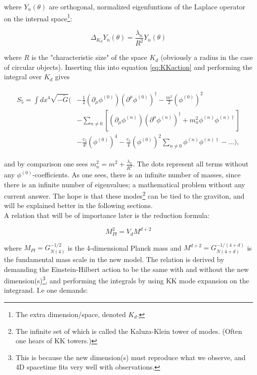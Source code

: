 \documentclass[11pt,a4paper]{article}
\begin{document}
where $Y_n(\theta)$ are orthogonal, normalized eigenfuntions of the Laplace operator on the internal space\footnote{The extra dimension/space, denoted $K_d$.}:

\begin{equation}
	\Delta_{K_d}Y_n(\theta) = \frac{\lambda_n}{R^2}Y_n(\theta)
\end{equation}

where $R$ is the "characteristic size" of the space $K_d$ (obviously a radius in the case of circular objects). Inserting this into equation \ref{eq:KKaction} and performing the integral over $K_d$ gives

\begin{align}
	\begin{split}
	S_5 = \int dx^4 \sqrt{-\tilde{G}}\bigg(&-\frac{1}{2}(\partial_ \mu\phi^{(0)})(\partial^\mu\phi^{(0)})^\dagger - \frac{m^2}{2}\left(\phi^{(0)}\right)^2\\
	& - \sum_{n\neq0} \left[(\partial_ \mu\phi^{(n)})(\partial^\mu\phi^{(n)})^\dagger + m_n^2\phi^{(n)}\phi^{(n)\dagger}\right]\\
	& - \frac{c_5}{4!}\left(\phi^{(0)}\right)^4 - \frac{c_5}{4}\left(\phi^{(0)}\right)^2\sum_{n\neq0} \phi^{(n)}\phi^{(n)\dagger} - \ldots\bigg),
	\end{split}
\end{align}

and by comparison one sees $m_n^2 = m^2 + \frac{\lambda_n}{R^2}$. The dots represent all terms without any $\phi^{(0)}$-coefficients. As one sees, there is an infinite number of masses, since there is an infinite number of eigenvalues; a mathematical problem without any current answer. The hope is that these modes\footnote{The infinite set of which is called the Kaluza-Klein tower of modes. (Often one hears of KK towers.)} can be tied to the graviton, and will be explained better in the following sections.\\

A relation that will be of importance later is the reduction formula:

\begin{equation}
	M_{Pl}^2 = V_dM^{d+2}
\end{equation}

where $M_{Pl} = G_{N(4)}^{-1/2}$ is the 4-dimensional Planck mass and $M^{d+2} = G_{N(4+d)}^{-1/(4+d)}$ is the fundamental mass scale in the new model. The relation is derived by demanding the Einstein-Hilbert action to be the same with and without the new dimension(s)\footnote{This is because the new dimension(s) must reproduce what we observe, and 4D spacetime fits very well with observations.}, and performing the integrals by using KK mode expansion on the integrand. I.e one demands:
\end{document}
